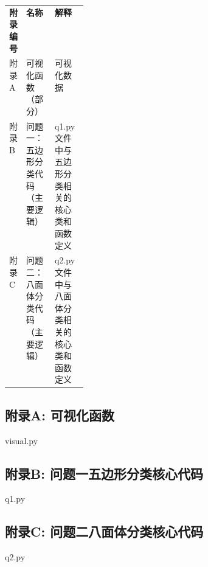 \begin{appendices} %
    

\begin{table}[H]
\centering
\begin{tabularx}{\linewidth}{| >{\centering}p{0.15\linewidth} | L | L |} %
\toprule
 \\ %
\midrule
\textbf{附录编号} & \textbf{名称} & \textbf{解释} \\ %
\midrule
附录A & 可视化函数（部分） & 可视化数据 \\
\midrule %
附录B & 问题一：五边形分类代码（主要逻辑） & q1.py 文件中与五边形分类相关的核心类和函数定义 \\
\midrule
附录C & 问题二：八面体分类代码（主要逻辑） & q2.py 文件中与八面体分类相关的核心类和函数定义 \\
\bottomrule
\end{tabularx}
\end{table}
    
\subsection*{附录A: 可视化函数}
    
\noindent visual.py

    
\subsection*{附录B: 问题一五边形分类核心代码}
    
\noindent q1.py


\subsection*{附录C: 问题二八面体分类核心代码}
    
\noindent q2.py

    
\end{appendices} %